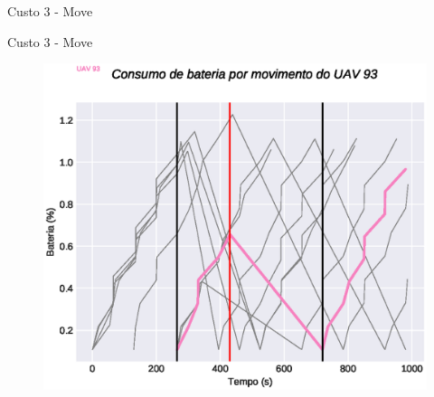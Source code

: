 \begin{frame}{Custo 3 - Move}
\begin{figure}[!htb]
                 \end{figure}
            \end{frame}\begin{frame}{Custo 3 - Move}
                \begin{figure}[!htb]
                     \includegraphics[width=\textwidth]{custo_3/uav_move_acum_uav_7.eps}
                 \end{figure}
            \end{frame}